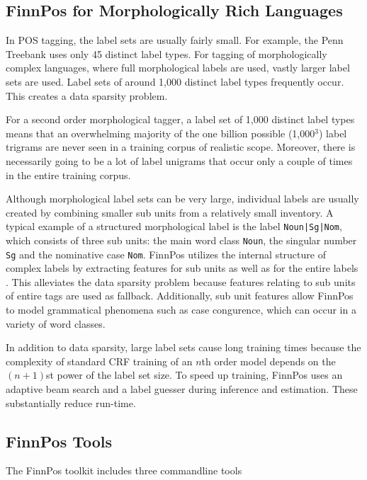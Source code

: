 \documentclass{llncs}
\begin{document}
\subsection{FinnPos for Morphologically Rich Languages}

In POS tagging, the label sets are usually fairly small. For example,
the Penn Treebank uses only 45 distinct label types. For tagging of
morphologically complex languages, where full morphological labels are
used, vastly larger label sets are used. Label sets of around 1,000
distinct label types frequently occur. This creates a data sparsity problem.

For a second order morphological tagger, a label set of 1,000 distinct
label types means that an overwhelming majority of the one billion
possible (1,000$^3$) label trigrams are never seen in a training
corpus of realistic scope. Moreover, there is necessarily going to be
a lot of label unigrams that occur only a couple of times in the entire
training corpus.

Although morphological label sets can be very large, individual labels
are usually created by combining smaller sub units from a relatively
small inventory. A typical example of a structured morphological label
is the label {\tt Noun|Sg|Nom}, which consists of three sub units: the
main word class {\tt Noun}, the singular number {\tt Sg} and the
nominative case {\tt Nom}. FinnPos utilizes the internal structure of
complex labels by extracting features for sub units  as
well as for the entire labels \cite{silfverberg/2014}. This alleviates
the data sparsity problem because features relating to sub units of
entire tags are used as fallback. Additionally, sub unit features
allow FinnPos to model grammatical phenomena such as case congurence, which can occur in a variety of word classes.

In addition to data sparsity, large label sets cause long training
times because the complexity of standard CRF training of an $n$th
order model depends on the $(n+1)$st power of the label set size. To
speed up training, FinnPos uses an adaptive beam search and a label
guesser \cite{silfverberg/2015} during inference and estimation. These
substantially reduce run-time.

\subsection{FinnPos Tools}

The FinnPos toolkit includes three commandline tools
\end{document}
